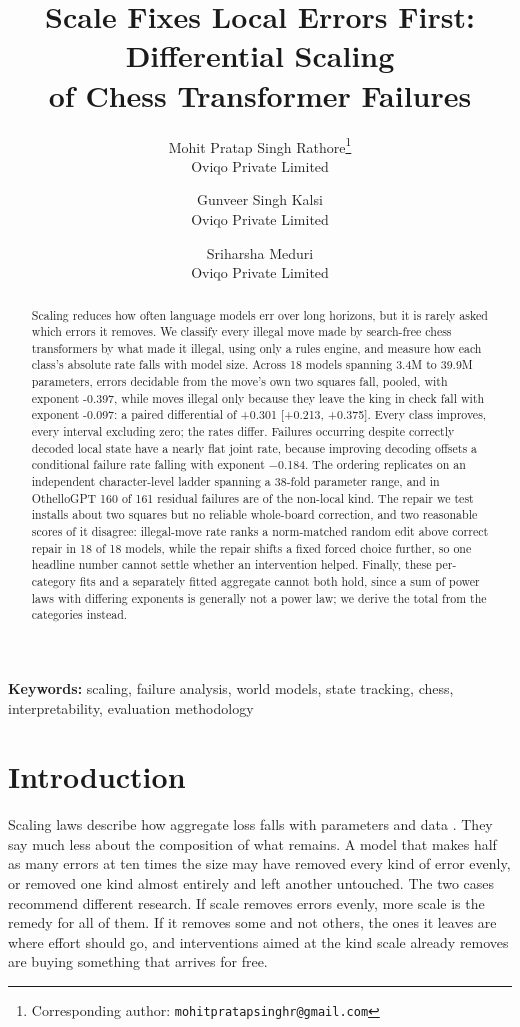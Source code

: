 \documentclass[11pt]{article}
\title{\bf Scale Fixes Local Errors First: Differential Scaling\\of Chess Transformer Failures}
\author{
    Mohit Pratap Singh Rathore\thanks{Corresponding author:
      \texttt{mohitpratapsinghr@gmail.com}}\\ \small Oviqo Private Limited
    \and
    Gunveer Singh Kalsi\\ \small Oviqo Private Limited
    \and
    Sriharsha Meduri\\ \small Oviqo Private Limited
  }
\date{}
\begin{document}
\maketitle

\begin{abstract}
Scaling reduces how often language models err over long horizons, but it is rarely
asked which errors it removes. We classify every illegal move made by search-free
chess transformers by what made it illegal, using only a rules engine, and measure
how each class's absolute rate falls with model size. Across
18 models spanning 3.4M to 39.9M parameters, errors decidable
from the move's own two squares fall, pooled, with exponent -0.397, while
moves illegal only because they leave the king in check fall with exponent
-0.097: a paired differential of +0.301 [+0.213,
+0.375]. Every
class improves, every interval excluding zero; the rates differ. Failures occurring despite
correctly decoded local state have a nearly flat joint rate, because improving
decoding offsets a conditional failure rate falling with exponent $-$0.184. The
ordering replicates on an independent character-level ladder spanning a
38-fold parameter range, and in OthelloGPT 160 of 161 residual
failures are of the non-local kind. The repair we test installs about two
squares but no reliable whole-board correction, and two reasonable scores of it
disagree:
illegal-move rate ranks a norm-matched random edit above correct repair in
18 of 18 models, while the repair shifts a fixed forced choice
further, so one headline number cannot settle whether an intervention helped.
Finally, these per-category fits and a separately fitted aggregate cannot both
hold, since a sum of power laws with differing exponents is generally not a power
law; we derive the total from the categories instead.
\end{abstract}

\noindent\textbf{Keywords:} scaling, failure analysis, world models, state
tracking, chess, interpretability, evaluation methodology

\section{Introduction}

Scaling laws describe how aggregate loss falls with parameters and data
\citep{kaplan2020scaling,hoffmann2022training}. They say much less about the
composition of what remains. A model that makes half as many errors at ten times
the size may have removed every kind of error evenly, or removed one kind almost
entirely and left another untouched. The two cases recommend different research.
If scale removes errors evenly, more scale is the remedy for all of them. If it
removes some and not others, the ones it leaves are where effort should go, and
interventions aimed at the kind scale already removes are buying something that
arrives for free.
\end{document}
